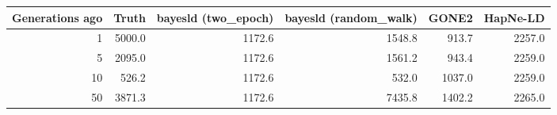 \begin{tabular}{rrrrrr}
\toprule
Generations ago & Truth & bayesld (two_epoch) & bayesld (random_walk) & GONE2 & HapNe-LD \\
\midrule
1 & 5000.0 & 1172.6 & 1548.8 & 913.7 & 2257.0 \\
5 & 2095.0 & 1172.6 & 1561.2 & 943.4 & 2259.0 \\
10 & 526.2 & 1172.6 & 532.0 & 1037.0 & 2259.0 \\
50 & 3871.3 & 1172.6 & 7435.8 & 1402.2 & 2265.0 \\
\bottomrule
\end{tabular}

